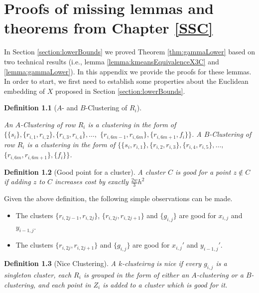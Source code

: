 \documentclass[letterpaper,12pt,titlepage,oneside,final]{book}
\newtheorem{definition}{Definition}
\begin{document}
\chapter{Proofs of missing lemmas and theorems from Chapter \ref{SSC}}
\label{appendix:lowerBoundProof}

In Section \ref{section:lowerBounds} we proved Theorem \ref{thm:gammaLower} based on two technical results (i.e., lemma \ref{lemma:kmeansEquivalenceX3C} and \ref{lemma:gammaLower}). In this appendix we provide the proofs for these lemmas. In order to start, we first need to establish some properties about the Euclidean embedding of $X$ proposed in Section \ref{section:lowerBounds}.


\begin{definition}[$A$- and $B$-Clustering of $R_i$]
\label{defn:abclusteringVattani}

An $A$-Clustering of row $R_i$ is a clustering in the form of $\{\{s_i\}, \{r_{i,1}, r_{i,2}\}, \{r_{i,3}, r_{i,4}\}, \ldots,$ $ \{r_{i,6m-1}, r_{i,6m}\},\{r_{i, 6m+1}, f_i\}\}$. A $B$-Clustering of row $R_i$ is a clustering in the form of $\{\{s_i, r_{i, 1}\}, \{r_{i,2}, r_{i,3}\}, \{r_{i,4}, r_{i,5}\}, \ldots,$ $ \{r_{i,6m}, r_{i,6m+1}\},\{f_i\}\}$. 
\end{definition}

\begin{definition}[Good point for a cluster]
\label{defn:goodPointVattani}
A cluster $C$ is good for a point $z \not\in C$ if adding $z$ to $C$ increases cost by exactly $\frac{2w}{3}h^2$ 
\end{definition}

Given the above definition, the following simple observations can be made. 
\begin{itemize}[nolistsep,noitemsep]
\item The clusters $\{r_{i,2j-1}, r_{i, 2j}\}$, $\{r_{i,2j}, r_{i, 2j+1}\}$ and $\{g_{i,j}\}$ are good for $x_{i,j}$ and $y_{i-1,j}$.
\item The clusters $\{r_{i,2j}, r_{i, 2j+1}\}$ and $\{g_{i,j}\}$ are good for $x_{i,j}'$ and $y_{i-1,j}'$.
\end{itemize}

\begin{definition}[Nice Clustering]
\label{defn:niceClustering}
A $k$-clusteirng is nice if every $g_{i,j}$ is a singleton cluster, each $R_i$ is grouped in the form of either an $A$-clustering or a $B$-clustering, and each point in $Z_i$ is added to a cluster which is good for it.
\end{definition}
\end{document}
